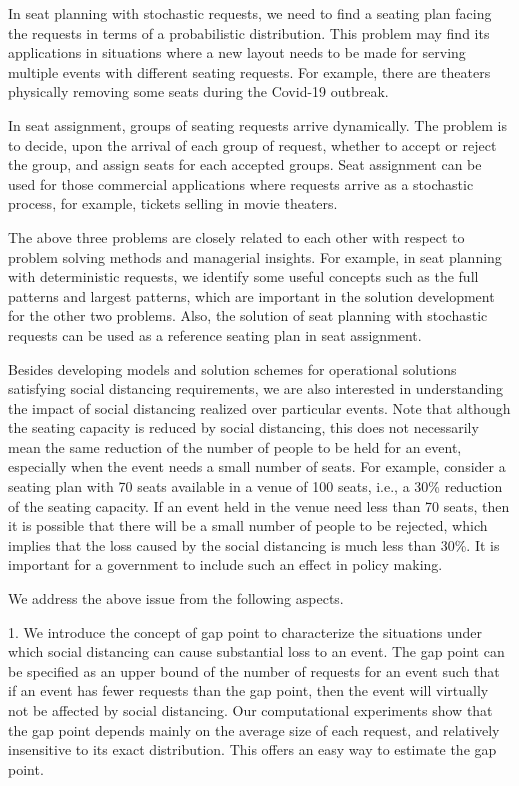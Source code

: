 In seat planning with stochastic requests, we need to find a seating plan facing the requests in terms of a probabilistic distribution. This problem may find its applications in situations where a new layout needs to be made for serving multiple events with different seating requests. For example, there are theaters physically removing some seats during the Covid-19 outbreak. \cite{Berlin_theater}

In seat assignment, groups of seating requests arrive dynamically. The problem is to decide, upon the arrival of each group of request, whether to accept or reject the group, and assign seats for each accepted groups. Seat assignment can be used for those commercial applications where requests arrive as a stochastic process, for example, tickets selling in movie theaters.

The above three problems are closely related to each other with respect to problem solving methods and managerial insights. For example, in seat planning with deterministic requests,
we identify some useful concepts such as the full patterns and largest patterns, which are important in the solution development for the other two problems. Also, the solution of seat planning with stochastic requests can be used  as a reference seating plan in seat assignment.


Besides developing models and solution schemes for operational solutions satisfying  social distancing requirements, we are also interested in understanding the impact of social  distancing realized over  particular events. Note that although the seating capacity  is reduced by social distancing, this does not necessarily mean the same reduction of the number of people to be held for an event, especially when the event  needs a small number of seats. For example, consider a seating plan with 70 seats available in a venue of 100 seats, i.e., a 30\% reduction of the seating capacity. If an event held in the venue need less than 70 seats, then it is possible that there will be a small number of people to be rejected, which implies that the loss caused by the social distancing is much less than 30\%. It is important for a government to include such an effect in policy making.

We address the above issue from the following aspects.


1. We introduce the concept of gap point to characterize the situations under which social distancing can cause substantial loss to an event. The gap point can be specified as an upper bound of the number of requests for an event such that if an event has fewer requests than the gap point, then the event will virtually not be affected by social distancing. Our computational experiments show that the gap point depends mainly on the average size of each request, and relatively insensitive to its exact distribution. This offers an easy way to estimate the gap point.


